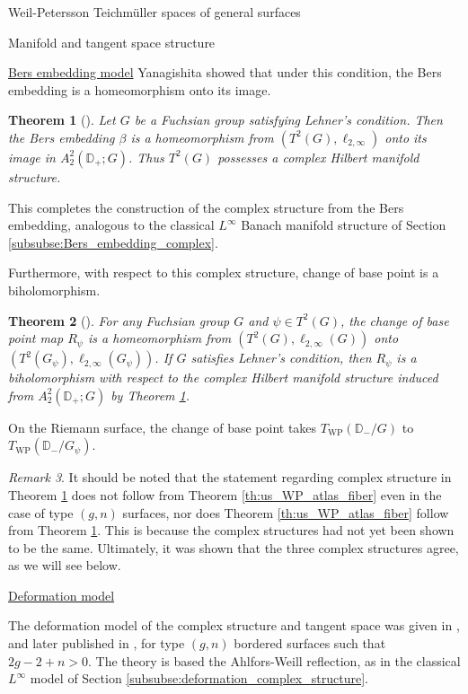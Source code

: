 \documentclass[12pt]{amsart}
\newcommand{\disk}{\ensuremath{\mathbb{D}} } %
\theoremstyle{plain}
\newtheorem{theorem}{Theorem}[section]
\theoremstyle{definition}
\theoremstyle{remark}
\newtheorem{remark}[theorem]{Remark}
\numberwithin{equation}{section} %
\numberwithin{figure}{section} %
\begin{document}
\begin{section}{Weil-Petersson Teichm\"uller spaces of general surfaces}
\begin{subsection}{Manifold and tangent space structure}
\begin{subsubsection}{{\underline{Bers embedding model}}}
 Yanagishita showed that under this condition, the Bers embedding is a homeomorphism onto its image.
 \begin{theorem}[\cite{Yanagishita}]  \label{th:Yanagishita_Bers_embedding}
  Let $G$ be a Fuchsian group satisfying Lehner's condition. Then the Bers embedding $\beta$ is a homeomorphism from $(T^2(G),\ell_{2,\infty})$ onto its image in $A^2_2(\disk_+;G)$. Thus $T^2(G)$ possesses a complex Hilbert manifold structure. 
 \end{theorem} 
 This completes the construction of the complex structure from the Bers embedding, analogous to the classical $L^\infty$ Banach manifold structure of Section \ref{subsubse:Bers_embedding_complex}. 

 Furthermore, with respect to this complex structure, change of base point is a biholomorphism. 
 \begin{theorem}[\cite{Yanagishita}] 
  For any Fuchsian group $G$ and $\psi \in T^2(G)$, 
  the change of base point map $R_\psi$ is a homeomorphism from $(T^2(G),\ell_{2,\infty}(G))$ onto $(T^2(G_\psi),\ell_{2,\infty}(G_\psi))$.  If $G$ satisfies Lehner's condition, then $R_\psi$ is a biholomorphism with respect to the complex Hilbert manifold structure induced from $A^2_2(\disk_+;G)$ by Theorem \ref{th:Yanagishita_Bers_embedding}. 
 \end{theorem}
 On the Riemann surface, the change of base point takes $T_{\mathrm{WP}}(\disk_-/G)$ to $T_{\mathrm{WP}}(\disk_-/G_\psi)$. 
 \begin{remark}
  It should be noted that the statement regarding complex structure in Theorem \ref{th:Yanagishita_Bers_embedding} does not follow from Theorem \ref{th:us_WP_atlas_fiber} even in the case of type $(g,n)$ surfaces, nor does Theorem \ref{th:us_WP_atlas_fiber} follow from Theorem \ref{th:Yanagishita_Bers_embedding}. This is because the complex structures had not yet been shown to be the same.  Ultimately, it was shown that the three complex structures agree, as we will see below. 
 \end{remark}
\end{subsubsection}
\begin{subsubsection}{{\underline{Deformation model}}}

 The deformation model of the complex structure and tangent space was given in \cite{RSS_WP_arxiv}, and later published in \cite{RSS_WP2}, for type $(g,n)$ bordered surfaces such that $2g-2+n>0$. The theory is based the Ahlfors-Weill reflection, as in the classical $L^\infty$ model of Section \ref{subsubse:deformation_complex_structure}.  
 

\end{subsubsection}
\end{subsection}
\end{section}
\end{document}
